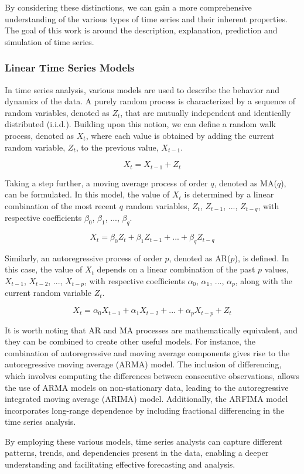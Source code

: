 \documentclass[../main.tex]{subfiles}
\begin{document}
        By considering these distinctions, we can gain a more comprehensive understanding of the various types of time series and their inherent properties. The goal of this work is around the description, explanation, prediction and simulation of time series.\par

    \subsubsection{Linear Time Series Models}
        In time series analysis, various models are used to describe the behavior and dynamics of the data. A purely random process is characterized by a sequence of random variables, denoted as {$Z_t$}, that are mutually independent and identically distributed (i.i.d.). Building upon this notion, we can define a random walk process, denoted as {$X_t$}, where each value is obtained by adding the current random variable, $Z_t$, to the previous value, $X_{t-1}$.

        $$X_t = X_{t-1} + Z_t$$

        Taking a step further, a moving average process of order $q$, denoted as MA($q$), can be formulated. In this model, the value of $X_t$ is determined by a linear combination of the most recent $q$ random variables, $Z_t$, $Z_{t-1}$, ..., $Z_{t-q}$, with respective coefficients $\beta_0$, $\beta_1$, ..., $\beta_q$.

        $$X_t = \beta_0Z_t + \beta_1Z_{t-1} + ...+ \beta_qZ_{t-q}$$

        Similarly, an autoregressive process of order $p$, denoted as AR($p$), is defined. In this case, the value of $X_t$ depends on a linear combination of the past $p$ values, $X_{t-1}$, $X_{t-2}$, ..., $X_{t-p}$, with respective coefficients $\alpha_0$, $\alpha_1$, ..., $\alpha_p$, along with the current random variable $Z_t$.

        $$X_t = \alpha_0X_{t-1} + \alpha_1X_{t-2} + ...+ \alpha_pX_{t-p} + Z_t$$
        
        It is worth noting that AR and MA processes are mathematically equivalent, and they can be combined to create other useful models. For instance, the combination of autoregressive and moving average components gives rise to the autoregressive moving average (ARMA) model. The inclusion of differencing, which involves computing the differences between consecutive observations, allows the use of ARMA models on non-stationary data, leading to the autoregressive integrated moving average (ARIMA) model. Additionally, the ARFIMA model incorporates long-range dependence by including fractional differencing in the time series analysis. \par

        By employing these various models, time series analysts can capture different patterns, trends, and dependencies present in the data, enabling a deeper understanding and facilitating effective forecasting and analysis.
\end{document}
